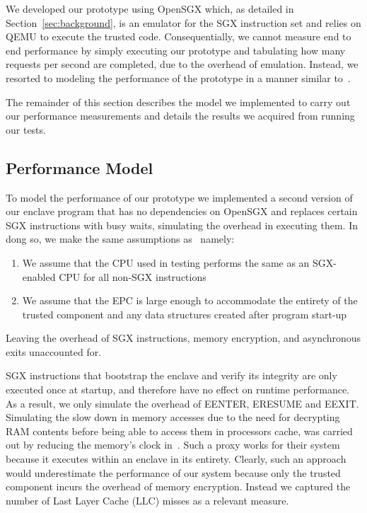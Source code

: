 \documentclass[../main.tex]{subfiles}
\begin{document}
We developed our prototype using OpenSGX which, as detailed in
Section~\ref{sec:background}, is an emulator for the SGX instruction
set and relies on QEMU to execute the trusted code. Consequentially,
we cannot measure end to end performance by simply executing our
prototype and tabulating how many requests per second are completed,
due to the overhead of emulation. Instead, we resorted to modeling the
performance of the prototype in a manner similar to~\cite{Baumann14}.

The remainder of this section describes the model we implemented to
carry out our performance measurements and details the results we
acquired from running our tests.

\subsection{Performance Model}

To model the performance of our prototype we implemented a second
version of our enclave program that has no dependencies on OpenSGX and
replaces certain SGX instructions with busy waits, simulating the
overhead in executing them. In dong so, we make the same assumptions
as~\cite{Baumann14} namely:
\begin{enumerate}
  \item We assume that the CPU used in testing performs the same as an
    SGX-enabled CPU for all non-SGX instructions
  \item We assume that the EPC is large enough to accommodate the
    entirety of the trusted component and any data structures created
    after program start-up
\end{enumerate}
Leaving the overhead of SGX instructions, memory encryption, and
asynchronous exits unaccounted for.

SGX instructions that bootstrap the enclave and verify its integrity
are only executed once at startup, and therefore have no effect on
runtime performance. As a result, we only simulate the overhead of
EENTER, ERESUME and EEXIT. Simulating the slow down in memory accesses
due to the need for decrypting RAM contents before being able to
access them in processors cache, was carried out by reducing the
memory's clock in~\cite{Baumann14}. Such a proxy works for their
system because it executes within an enclave in its entirety. Clearly,
such an approach would underestimate the performance of our system
because only the trusted component incurs the overhead of memory
encryption. Instead we captured the number of Last Layer Cache (LLC)
misses as a relevant measure.
\end{document}
